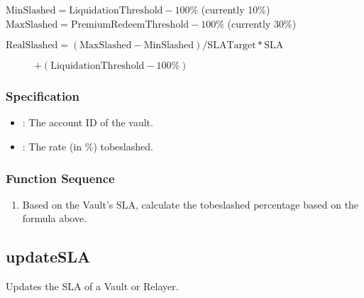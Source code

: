 \documentclass[a4paper,10pt,english]{sphinxmanual}
\begin{document}
\(\text{MinSlashed} = \text{LiquidationThreshold} - 100\%\) (currently 10\%)
\(\text{MaxSlashed} = \text{PremiumRedeemThreshold} - 100\%\) (currently 30\%)
\begin{description}
\item[{\(\text{RealSlashed} = (\text{MaxSlashed} - \text{MinSlashed}) / \text{SLATarget} * \text{SLA}\)}] \leavevmode
\(+ (\text{LiquidationThreshold} - 100\%)\)

\end{description}


\subsubsection{Specification}
\label{\detokenize{spec/sla:specification}}


\begin{itemize}
\item {} 
: The account ID of the vault.

\end{itemize}

\begin{itemize}
\item {} 
: The rate (in \%) to\sphinxhyphen{}be\sphinxhyphen{}slashed.

\end{itemize}


\subsubsection{Function Sequence}
\label{\detokenize{spec/sla:function-sequence}}\begin{enumerate}
%
\item {} 
Based on the Vault’s SLA, calculate the to\sphinxhyphen{}be\sphinxhyphen{}slashed percentage based on the formula above.

\end{enumerate}


\subsection{updateSLA}
\label{\detokenize{spec/sla:updatesla}}\label{\detokenize{spec/sla:id3}}
Updates the SLA of a Vault or Relayer.
\end{document}
